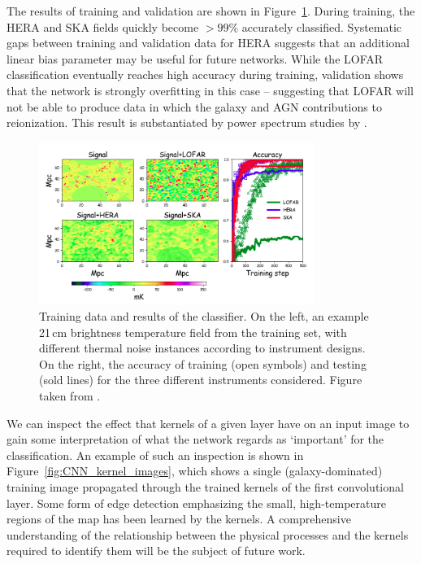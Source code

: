 The results of training and validation are shown in Figure~\ref{fig:hassan-results}. During training, the HERA and SKA fields quickly become $>99\%$ accurately classified. Systematic gaps between training and validation data for HERA suggests that an additional linear bias parameter may be useful for future networks. While the LOFAR classification eventually reaches high accuracy during training, validation shows that the network is strongly overfitting in this case -- suggesting that LOFAR will not be able to produce data in which the galaxy and AGN contributions to reionization. This result is substantiated by power spectrum studies by \cite{Hassan.17}.

\begin{figure}
\centering
\includegraphics[width=0.8\textwidth]{chapters/hera_ml/figures/hassan-results.png}
\caption[Training data and results of the classifier.]{Training data and results of the classifier. On the left, an example 21\,cm brightness temperature field from the training set, with different thermal noise instances according to instrument designs. On the right, the accuracy of training (open symbols) and testing (sold lines) for the three different instruments considered. Figure taken from \cite{Hassan.18}.}
\label{fig:hassan-results}
\end{figure}

We can inspect the effect that kernels of a given layer have on an input image to gain some interpretation of what the network regards as `important' for the classification. An example of such an inspection is shown in Figure~\ref{fig:CNN_kernel_images}, which shows a single (galaxy-dominated) training image propagated through the trained kernels of the first convolutional layer. Some form of edge detection emphasizing the small, high-temperature regions of the map has been learned by the kernels. A comprehensive understanding of the relationship between the physical processes and the kernels required to identify them will be the subject of future work.

